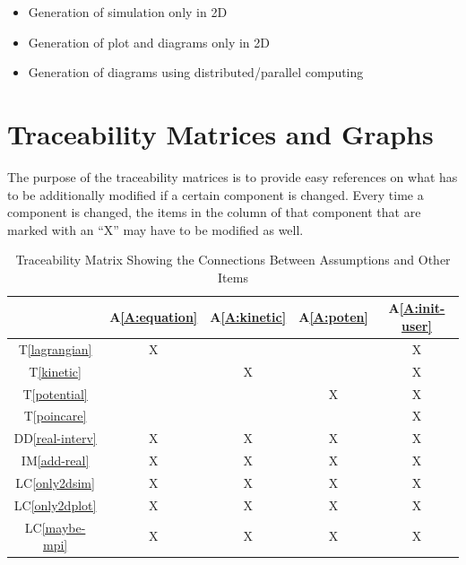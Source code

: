 \documentclass[12pt]{article}
\newcommand{\ddref}[1]{DD\ref{#1}}
\newcommand{\tref}[1]{T\ref{#1}}
\newcommand{\aref}[1]{A\ref{#1}}
\newcommand{\iref}[1]{IM\ref{#1}}
\newcounter{lcnum} %
\newcommand{\lcref}[1]{LC\ref{#1}}
\begin{document}
\noindent \begin{itemize}

\item[LC\refstepcounter{lcnum}\thelcnum \label{only2dsim}:] Generation of simulation only in 2D
\item[LC\refstepcounter{lcnum}\thelcnum \label{only2dplot}:] Generation of plot and diagrams only in 2D
\item[LC\refstepcounter{lcnum}\thelcnum \label{maybe-mpi}:] Generation of diagrams 
  using distributed/parallel computing

\end{itemize}

\section{Traceability Matrices and Graphs}

The purpose of the traceability matrices is to provide easy references on what
has to be additionally modified if a certain component is changed.  Every time a
component is changed, the items in the column of that component that are marked
with an ``X'' may have to be modified as well. 


\begin{table}[h!]
\centering
\label{Table:A_trace}
\begin{tabular}{|c|c|c|c|c|}
\hline
	& \aref{A:equation} 
	& \aref{A:kinetic}
	& \aref{A:poten}
	& \aref{A:init-user} \\
\hline
\tref{lagrangian} & X &  &  & X \\ \hline
\tref{kinetic} &  & X &  & X \\ \hline
\tref{potential} &  &  & X & X \\ \hline
\tref{poincare} &  &  &  & X \\ \hline
\ddref{real-interv} & X & X & X & X \\ \hline
\iref{add-real} & X & X & X & X \\ \hline
\lcref{only2dsim} & X & X & X & X \\ \hline
\lcref{only2dplot} & X & X & X & X \\ \hline
\lcref{maybe-mpi} & X & X & X & X\\ \hline
\end{tabular}
\caption{Traceability Matrix Showing the Connections Between Assumptions and Other Items}

\end{table}
\end{document}

